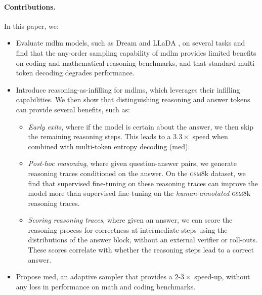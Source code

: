 \paragraph{Contributions.} In this paper, we:
\begin{itemize}[leftmargin=*]
    \item Evaluate \gls{mdlm} models, such as Dream \citep{Dreamon2025} and LLaDA \citep{nie2025largelanguagediffusionmodels}, on several tasks and find that the any-order sampling capability of \gls{mdlm} provides limited benefits on coding and mathematical reasoning benchmarks, and that standard multi-token decoding degrades performance.
    \item Introduce {reasoning-as-infilling} for \glspl{mdlm}, which leverages their infilling capabilities. We then show that distinguishing reasoning and answer tokens can provide several benefits, such as:
    \begin{itemize}[leftmargin=*]
        \item \textit{Early exits}, where if the model is certain about the answer, we then skip the remaining reasoning steps. This leads to a $3.3\times$ speed when combined with multi-token entropy decoding (\gls{med}). 
        \item \textit{Post-hoc reasoning}, where given question-answer pairs, we generate reasoning traces conditioned on the answer. On the \textsc{gsm8}k dataset, we find that supervised fine-tuning on these reasoning traces can improve the model more than supervised fine-tuning on the \textit{human-annotated} \textsc{gsm8}k reasoning traces.         
                
        \item \textit{Scoring reasoning traces}, where given an answer, we can score the reasoning process for correctness at intermediate steps using the distributions of the answer block, without an external verifier or roll-outs. These scores correlate with whether the reasoning steps lead to a correct answer. 
    \end{itemize}
        
    \item Propose \gls{med}, an adaptive sampler that provides a $2$-$3\times$ speed-up, without any loss in performance on math and coding benchmarks.    
\end{itemize}








